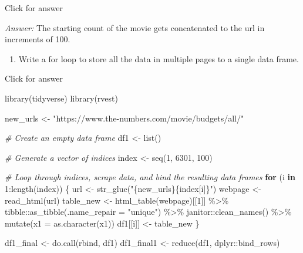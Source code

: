 \documentclass[
]{book}
\newenvironment{Shaded}{\begin{snugshade}}{\end{snugshade}}
\newcommand{\AttributeTok}[1]{\textcolor[rgb]{0.77,0.63,0.00}{#1}}
\newcommand{\CommentTok}[1]{\textcolor[rgb]{0.56,0.35,0.01}{\textit{#1}}}
\newcommand{\ControlFlowTok}[1]{\textcolor[rgb]{0.13,0.29,0.53}{\textbf{#1}}}
\newcommand{\DecValTok}[1]{\textcolor[rgb]{0.00,0.00,0.81}{#1}}
\newcommand{\FunctionTok}[1]{\textcolor[rgb]{0.00,0.00,0.00}{#1}}
\newcommand{\NormalTok}[1]{#1}
\newcommand{\OtherTok}[1]{\textcolor[rgb]{0.56,0.35,0.01}{#1}}
\newcommand{\SpecialCharTok}[1]{\textcolor[rgb]{0.00,0.00,0.00}{#1}}
\newcommand{\StringTok}[1]{\textcolor[rgb]{0.31,0.60,0.02}{#1}}
\providecommand{\tightlist}{%
  \setlength{\itemsep}{0pt}\setlength{\parskip}{0pt}}
\begin{document}
Click for answer

\emph{Answer:} The starting count of the movie gets concatenated to the url in increments of 100.

\begin{enumerate}
\def\labelenumi{\arabic{enumi}.}
\setcounter{enumi}{2}
\tightlist
\item
  Write a for loop to store all the data in multiple pages to a single data frame.
\end{enumerate}

Click for answer

\begin{Shaded}
\begin{Highlighting}[]
\FunctionTok{library}\NormalTok{(tidyverse)}
\FunctionTok{library}\NormalTok{(rvest)}

\NormalTok{new\_urls }\OtherTok{\textless{}{-}} \StringTok{"https://www.the{-}numbers.com/movie/budgets/all/"}

\CommentTok{\# Create an empty data frame}
\NormalTok{df1 }\OtherTok{\textless{}{-}} \FunctionTok{list}\NormalTok{()}

\CommentTok{\# Generate a vector of indices}
\NormalTok{index }\OtherTok{\textless{}{-}} \FunctionTok{seq}\NormalTok{(}\DecValTok{1}\NormalTok{, }\DecValTok{6301}\NormalTok{, }\DecValTok{100}\NormalTok{)}
\end{Highlighting}
\end{Shaded}

\begin{Shaded}
\begin{Highlighting}[]
\CommentTok{\# Loop through indices, scrape data, and bind the resulting data frames}
\ControlFlowTok{for}\NormalTok{ (i }\ControlFlowTok{in} \DecValTok{1}\SpecialCharTok{:}\FunctionTok{length}\NormalTok{(index)) \{}
\NormalTok{  url }\OtherTok{\textless{}{-}} \FunctionTok{str\_glue}\NormalTok{(}\StringTok{"\{new\_urls\}\{index[i]\}"}\NormalTok{)}
\NormalTok{  webpage }\OtherTok{\textless{}{-}} \FunctionTok{read\_html}\NormalTok{(url)}
\NormalTok{  table\_new }\OtherTok{\textless{}{-}} \FunctionTok{html\_table}\NormalTok{(webpage)[[}\DecValTok{1}\NormalTok{]] }\SpecialCharTok{\%\textgreater{}\%}
\NormalTok{    tibble}\SpecialCharTok{::}\FunctionTok{as\_tibble}\NormalTok{(}\AttributeTok{.name\_repair =} \StringTok{"unique"}\NormalTok{) }\SpecialCharTok{\%\textgreater{}\%} 
\NormalTok{    janitor}\SpecialCharTok{::}\FunctionTok{clean\_names}\NormalTok{() }\SpecialCharTok{\%\textgreater{}\%} 
    \FunctionTok{mutate}\NormalTok{(}\AttributeTok{x1 =} \FunctionTok{as.character}\NormalTok{(x1))}
\NormalTok{  df1[[i]] }\OtherTok{\textless{}{-}}\NormalTok{ table\_new}
\NormalTok{\}}

\NormalTok{df1\_final }\OtherTok{\textless{}{-}} \FunctionTok{do.call}\NormalTok{(rbind, df1)}
\NormalTok{df1\_final1 }\OtherTok{\textless{}{-}} \FunctionTok{reduce}\NormalTok{(df1, dplyr}\SpecialCharTok{::}\NormalTok{bind\_rows)}
\end{Highlighting}
\end{Shaded}
\end{document}
